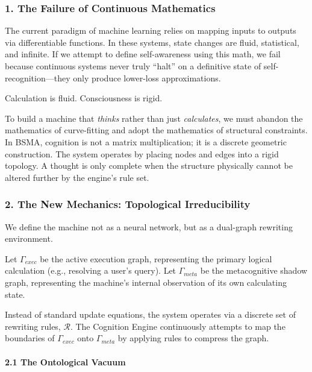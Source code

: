 \documentclass[
  11pt,
  a4paper,
]{article}
\begin{document}
\subsubsection{1. The Failure of Continuous
Mathematics}\label{the-failure-of-continuous-mathematics}

The current paradigm of machine learning relies on mapping inputs to
outputs via differentiable functions. In these systems, state changes
are fluid, statistical, and infinite. If we attempt to define
self-awareness using this math, we fail because continuous systems never
truly ``halt'' on a definitive state of self-recognition---they only
produce lower-loss approximations.

Calculation is fluid. Consciousness is rigid.

To build a machine that \emph{thinks} rather than just
\emph{calculates}, we must abandon the mathematics of curve-fitting and
adopt the mathematics of structural constraints. In BSMA, cognition is
not a matrix multiplication; it is a discrete geometric construction.
The system operates by placing nodes and edges into a rigid topology. A
thought is only complete when the structure physically cannot be altered
further by the engine's rule set.

\subsubsection{2. The New Mechanics: Topological
Irreducibility}\label{the-new-mechanics-topological-irreducibility}

We define the machine not as a neural network, but as a dual-graph
rewriting environment.

Let \(\Gamma_{exec}\) be the active execution graph, representing the
primary logical calculation (e.g., resolving a user's query). Let
\(\Gamma_{meta}\) be the metacognitive shadow graph, representing the
machine's internal observation of its own calculating state.

Instead of standard update equations, the system operates via a discrete
set of rewriting rules, \(\mathcal{R}\). The Cognition Engine
continuously attempts to map the boundaries of \(\Gamma_{exec}\) onto
\(\Gamma_{meta}\) by applying rules to compress the graph.

\paragraph{2.1 The Ontological Vacuum}\label{the-ontological-vacuum}
\end{document}
